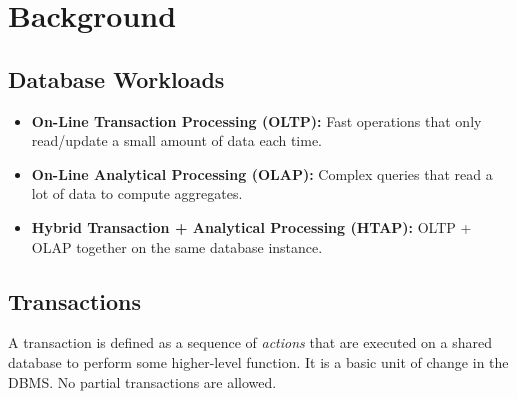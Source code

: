 \documentclass[11pt]{article}
\begin{document}
\maketitle
\thispagestyle{plain}

\section{Background}

\subsection*{Database Workloads}

\begin{itemize}
    \item \textbf{On-Line Transaction Processing (OLTP):}
    Fast operations that only read/update a small amount of data each time.
    
    \item \textbf{On-Line Analytical Processing (OLAP):}
    Complex queries that read a lot of data to compute aggregates.
    
    \item \textbf{Hybrid Transaction + Analytical Processing (HTAP):}
    OLTP + OLAP together on the same database instance.
\end{itemize}

\subsection*{Transactions}

A transaction is defined as a sequence of \textit{actions} that are executed on a shared database to 
perform some higher-level function. It is a basic unit of change in the DBMS. No partial 
transactions are allowed.
\end{document}
